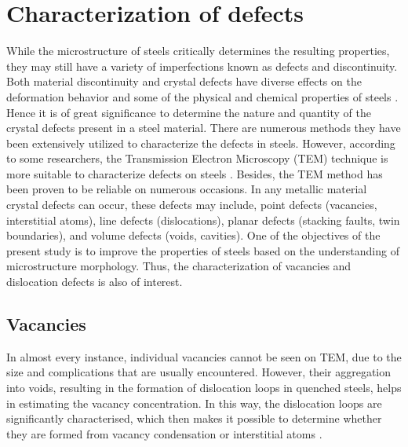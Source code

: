 \section{Characterization of defects} 
While the microstructure of steels critically determines the resulting properties, they may still have a variety of imperfections known as defects and discontinuity. Both material discontinuity and crystal defects have diverse effects on the deformation behavior and some of the physical and chemical properties of steels \cite{suryanarayana2017microstructure}. Hence it is of great significance to determine the nature and quantity of the crystal defects present in a steel material. 
There are numerous methods they have been extensively utilized to characterize the defects in steels. However, according to some researchers, the Transmission Electron Microscopy (TEM) technique is more suitable to characterize defects on steels \cite{george2002introduction, bhadeshia2017steels}. Besides, the TEM method has been proven to be reliable on numerous occasions. In any metallic material crystal defects can occur, these defects may include, point defects (vacancies, interstitial atoms), line defects (dislocations), planar defects (stacking faults, twin boundaries), and volume defects (voids, cavities). One of the objectives of the present study is to improve the properties of steels based on the understanding of microstructure morphology. Thus, the characterization of vacancies and dislocation defects is also of interest.

\subsection{Vacancies} 
 In almost every instance, individual vacancies cannot be seen on TEM, due to the size and complications that are usually encountered. However, their aggregation into voids, resulting in the formation of dislocation loops in quenched steels, helps in estimating the vacancy concentration. In this way, the dislocation loops are significantly characterised, which then makes it possible to determine whether they are formed from vacancy condensation or interstitial atoms \cite{suryanarayana2017microstructure}.

